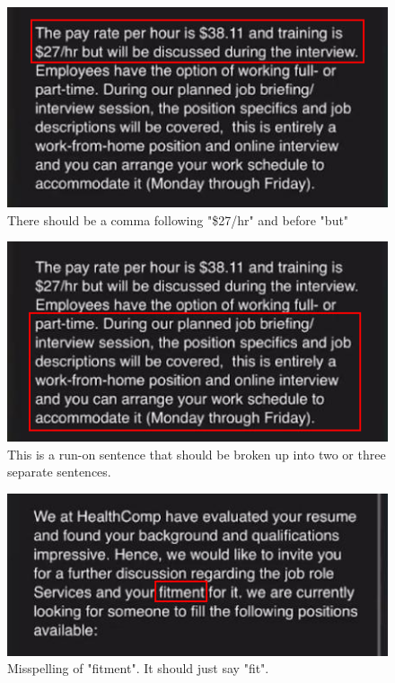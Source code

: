\begin{fullwidth}
    \begin{figure}[H] %
        \label{sec:Fig12}
        \centering
        \includegraphics[width=.9\linewidth]{assets/missedCommas.png}
        \captionsetup{justification=centering}
        \caption{There should be a comma following "\$27/hr" and before "but"}
    \end{figure}

    \begin{figure}[H] %
        \label{sec:Fig13}
        \centering
        \includegraphics[width=.9\linewidth]{assets/runon.png}
        \captionsetup{justification=centering}
        \caption{This is a run-on sentence that should be broken up into two or three separate sentences.}
    \end{figure}

    \begin{figure}[H] %
        \label{sec:Fig13}
        \centering
        \includegraphics[width=.9\linewidth]{assets/misspelling.png}
        \captionsetup{justification=centering}
        \caption{Misspelling of "fitment". It should just say "fit".}
    \end{figure}


\end{fullwidth}
